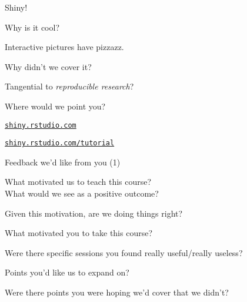 \documentclass[12pt,t]{beamer}
\begin{document}
\begin{frame}[c]{Shiny!}

  \bbi
\item[] Why is it cool?
  \bi
\item Interactive pictures have pizzazz.
  \ei
\item[] Why didn't we cover it?
    \bi
    \item Tangential to \emph{reproducible research}?
    \ei
\item[] Where would we point you?
    \bi
  \item \href{http://shiny.rstudio.com/}{\tt shiny.rstudio.com}
  \item \href{http://shiny.rstudio.com/tutorial}{\tt shiny.rstudio.com/tutorial}
   \ei
\ei


\end{frame}










\begin{frame}[c]{Feedback we'd like from you (1)}

  {\lolit What motivated us to teach this course? \\
  What would we see as a positive outcome? \\[18pt]}

  \bi
\item Given this motivation, are we doing things right?
\item What motivated you to take this course?
\item Were there specific sessions you found really useful/really
    useless?
  \item Points you'd like us to expand on?
  \item Were there points you were hoping we'd cover that we didn't?
    \ei

  \note{}


\end{frame}
\end{document}
